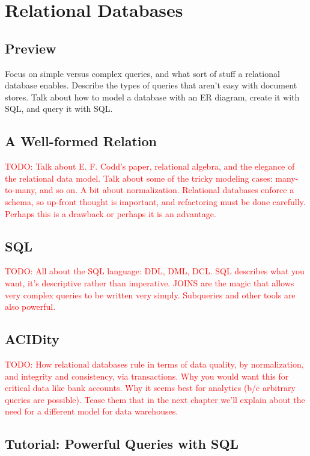 \documentclass[11pt]{book}
\newcommand{\todo}[1]{\textcolor{red}{TODO: #1}} %
\begin{document}
\chapter{Relational Databases}

\section*{Preview}

Focus on simple versus complex queries, and what sort of stuff a relational database enables.  Describe the types of queries that aren't easy with document stores.  Talk about how to model a database with an ER diagram, create it with SQL, and query it with SQL.

\section{A Well-formed Relation}
\todo{Talk about E. F. Codd's paper, relational algebra, and the elegance of the relational data model.  Talk about some of the tricky modeling cases: many-to-many, and so on.  A bit about normalization.  Relational databases enforce a schema, so up-front thought is important, and refactoring must be done carefully.  Perhaps this is a drawback or perhaps it is an advantage.}

\section{SQL}
\todo{All about the SQL language: DDL, DML, DCL.  SQL describes what you want, it's descriptive rather than imperative.  JOINS are the magic that allows very complex queries to be written very simply.  Subqueries and other tools are also powerful.}

\section{ACIDity}
\todo{How relational databases rule in terms of data quality, by normalization, and integrity and consistency, via transactions.  Why you would want this for critical data like bank accounts.  Why it seems best for analytics (b/c arbitrary queries are possible).  Tease them that in the next chapter we'll explain about the need for a different model for data warehouses.}

\section*{Tutorial: Powerful Queries with SQL}
\end{document}
